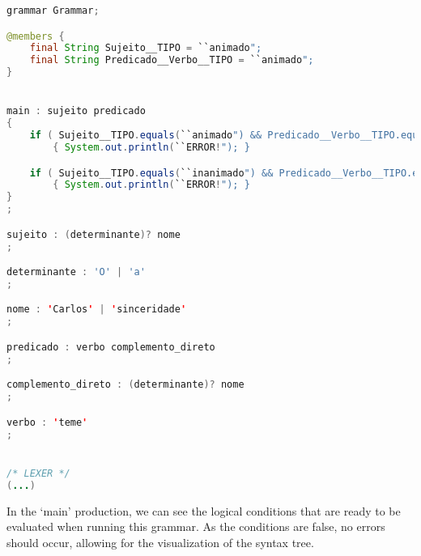 \begin{center}
\begin{minipage}{15cm}
\begin{lstlisting}[language=java, basicstyle=\tiny, label={lst:case_study_sentence}, caption=Example of a specific generated grammar.]
grammar Grammar;

@members {
    final String Sujeito__TIPO = ``animado";
    final String Predicado__Verbo__TIPO = ``animado";
}


main : sujeito predicado
{
    if ( Sujeito__TIPO.equals(``animado") && Predicado__Verbo__TIPO.equals(``inanimado") ) 
        { System.out.println(``ERROR!"); }

    if ( Sujeito__TIPO.equals(``inanimado") && Predicado__Verbo__TIPO.equals(``animado") ) 
        { System.out.println(``ERROR!"); }
}
;

sujeito : (determinante)? nome 
;

determinante : 'O' | 'a'
;

nome : 'Carlos' | 'sinceridade'
;

predicado : verbo complemento_direto 
;

complemento_direto : (determinante)? nome 
;

verbo : 'teme'
;


/* LEXER */
(...)
\end{lstlisting}
\end{minipage}
\end{center}

In the ‘main’ production, we can see the logical conditions that are ready to be evaluated when running this grammar. As the conditions are false, no errors should occur,
allowing for the visualization of the syntax tree.


%
%
%
%
%

